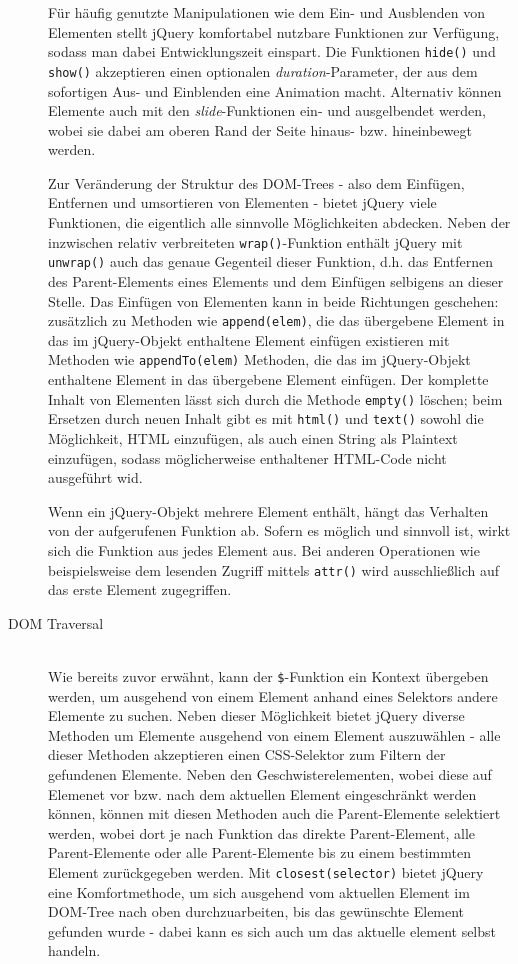 \begin{description}
Für häufig genutzte Manipulationen wie dem Ein- und Ausblenden von Elementen stellt jQuery
komfortabel nutzbare Funktionen zur Verfügung, sodass man dabei Entwicklungszeit einspart. Die
Funktionen \lstinline{hide()} und \lstinline{show()} akzeptieren einen optionalen
\emph{duration}-Parameter, der aus dem sofortigen Aus- und Einblenden eine Animation macht.
Alternativ können Elemente auch mit den \emph{slide}-Funktionen ein- und ausgelbendet werden, wobei
sie dabei am oberen Rand der Seite hinaus- bzw. hineinbewegt werden.

Zur Veränderung der Struktur des DOM-Trees - also dem Einfügen, Entfernen und umsortieren von
Elementen - bietet jQuery viele Funktionen, die eigentlich alle sinnvolle Möglichkeiten abdecken.
Neben der inzwischen relativ verbreiteten \lstinline{wrap()}-Funktion enthält jQuery mit
\lstinline{unwrap()} auch das genaue Gegenteil dieser Funktion, d.h. das Entfernen des
Parent-Elements eines Elements und dem Einfügen selbigens an dieser Stelle. Das Einfügen von
Elementen kann in beide Richtungen geschehen: zusätzlich zu Methoden wie \lstinline{append(elem)},
die das übergebene Element in das im jQuery-Objekt enthaltene Element einfügen existieren mit
Methoden wie \lstinline{appendTo(elem)} Methoden, die das im jQuery-Objekt enthaltene Element in das
übergebene Element einfügen. Der komplette Inhalt von Elementen lässt sich durch die Methode
\lstinline{empty()} löschen; beim Ersetzen durch neuen Inhalt gibt es mit \lstinline{html()} und
\lstinline{text()} sowohl die Möglichkeit, HTML einzufügen, als auch einen String als Plaintext
einzufügen, sodass möglicherweise enthaltener HTML-Code nicht ausgeführt wid.

Wenn ein jQuery-Objekt mehrere Element enthält, hängt das Verhalten von der aufgerufenen Funktion
ab. Sofern es möglich und sinnvoll ist, wirkt sich die Funktion aus jedes Element aus. Bei anderen
Operationen wie beispielsweise dem lesenden Zugriff mittels \lstinline{attr()} wird ausschließlich
auf das erste Element zugegriffen.

\item[DOM Traversal] \hfill \\
Wie bereits zuvor erwähnt, kann der \lstinline{$}-Funktion ein Kontext übergeben werden, um
ausgehend von einem Element anhand eines Selektors andere Elemente zu suchen. Neben dieser
Möglichkeit bietet jQuery diverse Methoden um Elemente ausgehend von einem Element auszuwählen -
alle dieser Methoden akzeptieren einen CSS-Selektor zum Filtern der gefundenen Elemente. Neben den
Geschwisterelementen, wobei diese auf Elemenet vor bzw. nach dem aktuellen Element eingeschränkt
werden können, können mit diesen Methoden auch die Parent-Elemente selektiert werden, wobei dort je
nach Funktion das direkte Parent-Element, alle Parent-Elemente oder alle Parent-Elemente bis zu
einem bestimmten Element zurückgegeben werden. Mit \lstinline{closest(selector)} bietet jQuery eine
Komfortmethode, um sich ausgehend vom aktuellen Element im DOM-Tree nach oben durchzuarbeiten, bis
das gewünschte Element gefunden wurde - dabei kann es sich auch um das aktuelle element selbst
handeln.


\end{description}

